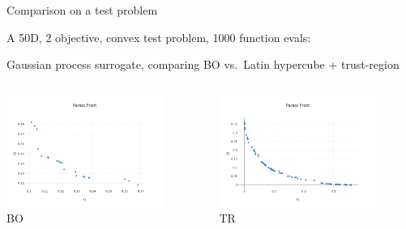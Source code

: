 \documentclass[aspectratio=169]{beamer}
\begin{document}
\begin{frame}{Comparison on a test problem}

A 50D, 2 objective, convex test problem, 1000 function evals:

\medskip

Gaussian process surrogate, comparing BO vs.\ Latin hypercube + trust-region

\bigskip

    \begin{columns}
        \begin{column}{0.49\textwidth}
            \centering
            \pause
            \includegraphics[width=0.8\textwidth]{../img/moo_new/BO_PF.jpeg}\\
            BO
        \end{column}
        \begin{column}{0.49\textwidth}
            \centering
            \pause
            \includegraphics[width=0.8\textwidth]{../img/moo_new/TR_PF.jpeg}\\
            TR
        \end{column}
    \end{columns}

    
\end{frame}
\end{document}
